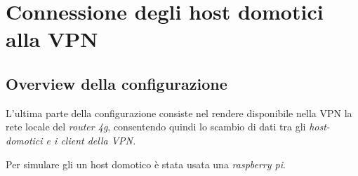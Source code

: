 
\chapter{Connessione degli host domotici alla VPN}
\label{ch:connessione-host-domotici}

\section{Overview della configurazione}

L'ultima parte della configurazione consiste nel rendere disponibile nella VPN la rete locale del \textit{router 4g}, consentendo quindi lo scambio di dati tra gli \it{host-domotici} e i client della VPN.

Per simulare gli un host domotico è stata usata una \textit{raspberry pi}.

